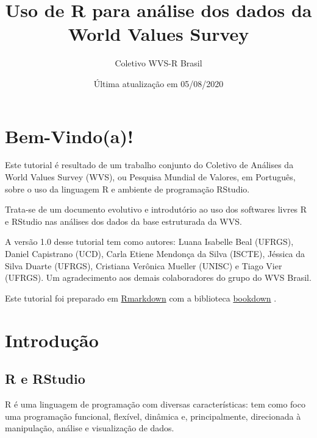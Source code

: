 \documentclass[
  10pt,
  brazil,
  a4paper,
  twoside, notitlepage, openright]{book}
\title{Uso de R para análise dos dados da World Values Survey}
\author{Coletivo WVS-R Brasil}
\date{Última atualização em 05/08/2020}
\let\oldmaketitle\maketitle
\begin{document}
\maketitle

\thispagestyle{empty}

\let\maketitle\oldmaketitle
\maketitle

{
\setcounter{tocdepth}{1}
\tableofcontents
}
\hypertarget{bem-vindoa}{%
\chapter*{Bem-Vindo(a)!}\label{bem-vindoa}}

Este tutorial é resultado de um trabalho conjunto do Coletivo de Análises da World Values Survey (WVS), ou Pesquisa Mundial de Valores, em Português, sobre o uso da linguagem R e ambiente de programação RStudio.

Trata-se de um documento evolutivo e introdutório ao uso dos softwares livres R e RStudio nas análises dos dados da base estruturada da WVS.

A versão 1.0 desse tutorial tem como autores: Luana Isabelle Beal (UFRGS), Daniel Capistrano (UCD), Carla Etiene Mendonça da Silva (ISCTE), Jéssica da Silva Duarte (UFRGS), Cristiana Verônica Mueller (UNISC) e Tiago Vier (UFRGS). Um agradecimento aos demais colaboradores do grupo do WVS Brasil.

Este tutorial foi preparado em \href{https://rmarkdown.rstudio.com/}{Rmarkdown} \citeyearpar{R-rmarkdown} com a biblioteca \href{https://bookdown.org/}{bookdown} \citeyearpar{R-bookdown}.

\hypertarget{intro}{%
\chapter{Introdução}\label{intro}}

\hypertarget{r-e-rstudio}{%
\section{R e RStudio}\label{r-e-rstudio}}

R é uma linguagem de programação com diversas características: tem como foco uma programação funcional, flexível, dinâmica e, principalmente, direcionada à manipulação, análise e visualização de dados.
\end{document}
